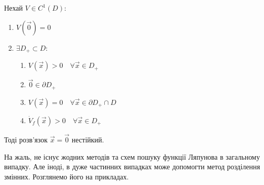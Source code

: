 \begin{boxteo}
  Нехай $V \in C^{1} (D):$
  \begin{enumerate}
  \item $V(\overrightarrow{0}) = 0$
  \item $\exists D_+ \subset D$:
  \begin{enumerate}
      \item $V(\overrightarrow{x} ) > 0 \quad \forall \overrightarrow{x} \in D_+$
      \item $\overrightarrow{0} \in \partial D_+ $
      \item $V(\overrightarrow{x}) = 0 \quad \forall \overrightarrow{x} \in \partial D_+ \cap D$
      \item $\dot{V}_f (\overrightarrow{x})>0 \quad \forall \overrightarrow{x }\in D_{+}$
  \end{enumerate}
  \end{enumerate}
  Тоді розв'язок $\overrightarrow{x} = \overrightarrow{0} $ нестійкий.
\end{boxteo}
\begin{remark}
    На жаль, не існує жодних методів та схем пошуку функції Ляпунова в загальному випадку. Але іноді, в дуже частинних випадках може допомогти метод розділення змінних. Розглянемо його на прикладах.
\end{remark}
